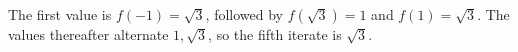 The first value is $f(-1)=\sqrt3$, followed by $f(\sqrt3)=1$ and $f(1)=\sqrt3$. The values thereafter alternate $1,\sqrt3$, so the fifth iterate is $\boxed{\sqrt3}$.

